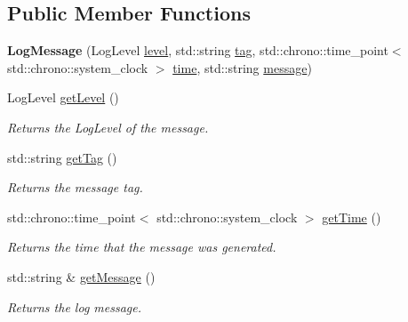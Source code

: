 \subsection*{Public Member Functions}
\begin{DoxyCompactItemize}
\item 
\mbox{\label{class_aws_1_1_iot_1_1_device_client_1_1_logging_1_1_log_message_abdaf457e13704aa4afa4047c5aa55865}} 
{\bfseries Log\+Message} (Log\+Level \hyperlink{class_aws_1_1_iot_1_1_device_client_1_1_logging_1_1_log_message_a088cb79700c2bdaee0f2855963dead08}{level}, std\+::string \hyperlink{class_aws_1_1_iot_1_1_device_client_1_1_logging_1_1_log_message_a751caf3538bd2d0c4c5ba8b2a160699c}{tag}, std\+::chrono\+::time\+\_\+point$<$ std\+::chrono\+::system\+\_\+clock $>$ \hyperlink{class_aws_1_1_iot_1_1_device_client_1_1_logging_1_1_log_message_ac527ebc5e1b1292741d830c1e5096cb9}{time}, std\+::string \hyperlink{class_aws_1_1_iot_1_1_device_client_1_1_logging_1_1_log_message_aef2c076d9c6cdf6890b71a63e4e02fc8}{message})
\item 
Log\+Level \hyperlink{class_aws_1_1_iot_1_1_device_client_1_1_logging_1_1_log_message_aca1e4e5b8ff937fd35745716f7d62bc8}{get\+Level} ()
\begin{DoxyCompactList}\small\item\em Returns the Log\+Level of the message. \end{DoxyCompactList}\item 
std\+::string \hyperlink{class_aws_1_1_iot_1_1_device_client_1_1_logging_1_1_log_message_a32d0716b00cdd136e490e09ac05787a2}{get\+Tag} ()
\begin{DoxyCompactList}\small\item\em Returns the message tag. \end{DoxyCompactList}\item 
std\+::chrono\+::time\+\_\+point$<$ std\+::chrono\+::system\+\_\+clock $>$ \hyperlink{class_aws_1_1_iot_1_1_device_client_1_1_logging_1_1_log_message_adaa5edba4e124584c6fe597ed76f90b1}{get\+Time} ()
\begin{DoxyCompactList}\small\item\em Returns the time that the message was generated. \end{DoxyCompactList}\item 
std\+::string \& \hyperlink{class_aws_1_1_iot_1_1_device_client_1_1_logging_1_1_log_message_af02a48506f5eb6e4023666d2d6f8a280}{get\+Message} ()
\begin{DoxyCompactList}\small\item\em Returns the log message. \end{DoxyCompactList}\end{DoxyCompactItemize}
